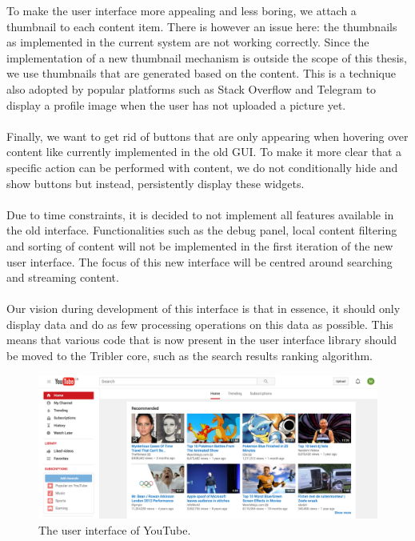 To make the user interface more appealing and less boring, we attach a thumbnail to each content item. There is however an issue here: the thumbnails as implemented in the current system are not working correctly. Since the implementation of a new thumbnail mechanism is outside the scope of this thesis, we use thumbnails that are generated based on the content. This is a technique also adopted by popular platforms such as Stack Overflow and Telegram to display a profile image when the user has not uploaded a picture yet.\\\\
Finally, we want to get rid of buttons that are only appearing when hovering over content like currently implemented in the old GUI. To make it more clear that a specific action can be performed with content, we do not conditionally hide and show buttons but instead, persistently display these widgets.\\\\
Due to time constraints, it is decided to not implement all features available in the old interface. Functionalities such as the debug panel, local content filtering and sorting of content will not be implemented in the first iteration of the new user interface. The focus of this new interface will be centred around searching and streaming content.\\\\
Our vision during development of this interface is that in essence, it should only display data and do as few processing operations on this data as possible. This means that various code that is now present in the user interface library should be moved to the Tribler core, such as the search results ranking algorithm.

\begin{figure}[t]
	\centering
	\includegraphics[width=1.0\columnwidth]{images/implementation/youtube_interface}
	\caption{The user interface of YouTube.}
	\label{fig:youtube-interface}
\end{figure}


